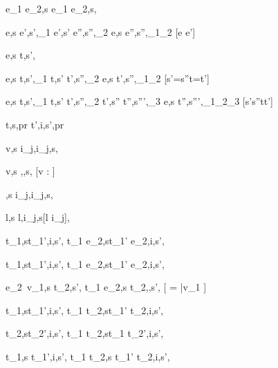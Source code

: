   { }
  {e_1 \Xor e_2,s \symstride e_1 \Xor e_2,s,\True}

    {e,s \symeval e',s',\phi_1  \Quad
     e',s' \symstride e'',s'',\phi_2}
    {e,s \symstride e'',s'',\phi_1\wedge\phi_2}
    [e \neq e']



  {e,s \symnormalise t,s',\phi}


    {e,s \symeval t,s',\phi_1  \Quad
     t,s' \symstride t',s'',\phi_2}
    {e,s \symnormalise t',s'',\phi_1\wedge\phi_2}
    [s'=s''\wedge t=t']

    {e,s \symeval t,s',\phi_1  \Quad
     t,s' \symstride t',s'',\phi_2  \Quad
     t',s'' \symnormalise t'',s''',\phi_3}
    {e,s \symnormalise t'',s''',\phi_1\wedge\phi_2\wedge\phi_3}
    [s'\neq s''\vee t\neq t']





  {t,s,pr \symhandle t',i,s',pr}

  { }
  {\Edit v,s \symhandle \Edit i_j,i_j,s,\True}

  { }
  {\Edit v,s \symhandle \Enter \tau,\Empty,s,\True}
  [v : \tau]

  { }
  {\Enter \tau,s \symhandle \Edit i_j,i_j,s,\True}

  { }
  {\Update l,s \symhandle \Update l,i_j,s[l \mapsto i_j],\True}


  {t_1,s\symhandle t_1',i,s',\phi}
  {t_1 \Then e_2,s\symhandle t_1' \Then e_2,i,s',\phi}

  {t_1,s\symhandle t_1',i,s',\phi}
  {t_1 \Next e_2,s\symhandle t_1' \Next e_2,i,s',\phi}

  {e_2\ v_1,s \symnormalise t_2,s',\phi}
  {t_1 \Next e_2,s \symhandle t_2,\Continue,s',\phi}
  [ = \bar{v}_1 \wedge \neg{}]


  {t_1,s\symhandle t_1',i,s',\phi}
  {t_1 \And t_2,s\symhandle t_1' \And t_2,\First i,s',\phi}

  {t_2,s\symhandle t_2',i,s',\phi}
  {t_1 \And t_2,s\symhandle t_1 \And t_2',\Second i,s',\phi}


  {t_1,s \symhandle t_1',i,s',\phi}
  {t_1 \Or t_2,s \symhandle t_1' \Or t_2,\First i,s',\phi}

